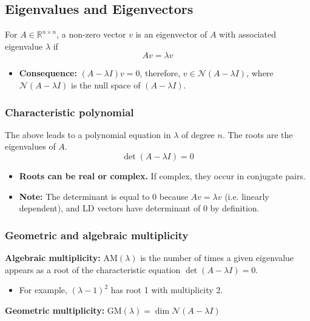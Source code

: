 \subsection{Eigenvalues and Eigenvectors}
\begin{definition}
    For $A \in \mathbb{R}^{n \times n}$, a non-zero vector $v$ is an eigenvector of $A$ with associated eigenvalue $\lambda$ if 
    \[
    A v = \lambda v
    \]
    \begin{itemize}
        \item \textbf{Consequence:} $(A - \lambda I) v = 0$, therefore, $v \in \mathcal{N}(A - \lambda I)$, where $\mathcal{N}(A - \lambda I)$ is the null space of $(A - \lambda I)$.    
    \end{itemize}
\end{definition}

\subsubsection{Characteristic polynomial}
\begin{definition} The above leads to a polynomial equation in $\lambda$ of degree $n$. The roots are the eigenvalues of $A$. 
    \[
    \det(A - \lambda I) = 0
    \]
    \begin{itemize}
        \item \textbf{Roots can be real or complex.} If complex, they occur in conjugate pairs.
        \item \textbf{Note:} The determinant is equal to 0 because $Av=\lambda v$ (i.e. linearly dependent), and LD vectors have determinant of $0$ by definition.
    \end{itemize}
\end{definition}

\subsubsection{Geometric and algebraic multiplicity}
\begin{definition}

    \textbf{Algebraic multiplicity:} $\text{AM}(\lambda)$ is the number of times a given eigenvalue appears as a root of the characteristic equation $\det(A - \lambda I) = 0$.
    \begin{itemize}
        \item For example, $(\lambda - 1)^2$ has root 1 with multiplicity 2.
    \end{itemize}
    \vspace{1em}

    \textbf{Geometric multiplicity:} $\text{GM}(\lambda) = \dim \mathcal{N}(A - \lambda I)$
\end{definition}

